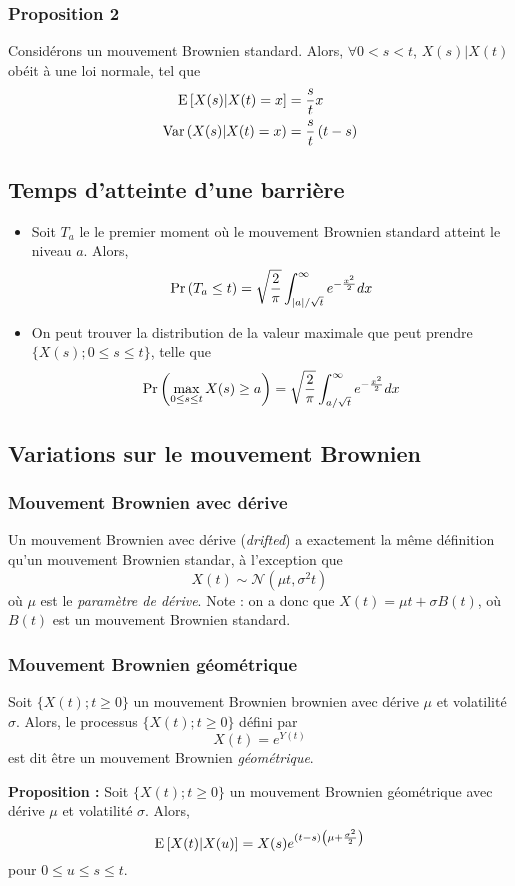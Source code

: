 \documentclass[10pt, french, landscape]{article}
\begin{document}
\begin{multicols*}{3}
\subsubsection*{Proposition 2}
Considérons un mouvement Brownien standard. Alors, $\forall 0 < s < t$, $X(s) | X(t)$ obéit à une loi normale, tel que
\begin{align*}
\mathrm{E} \left[ X(s) | X(t) = x \right]&  = \frac{s}{t} x \\
\mathrm{Var} \left( X(s) |X(t) = x \right) & = \frac{s}{t} \left( t - s \right) \\
\end{align*}

\subsection*{Temps d'atteinte d'une barrière}
\begin{itemize}
\item Soit $T_a$ le le premier moment où le mouvement Brownien standard atteint le niveau $a$. Alors,
\[\Pr \left( T_a \leq t \right) = \sqrt{\frac{2}{\pi}} \int_{|a| / \sqrt{t}}^{\infty} e^{- \frac{x^2}{2}} dx   \]

\item On peut trouver la distribution de la valeur maximale que peut prendre $\{ X(s) ; 0 \leq s \leq t \}$, telle que
\[\Pr \left( \max_{0 \leq s \leq t} X(s) \geq a \right) =  \sqrt{\frac{2}{\pi}} \int_{a / \sqrt{t}}^{\infty} e^{- \frac{x^2}{2}} dx\]
\end{itemize}


\subsection*{Variations sur le mouvement Brownien}
\subsubsection*{Mouvement Brownien avec dérive}
Un mouvement Brownien avec dérive (\emph{drifted}) a exactement la même définition qu'un mouvement Brownien standar, à l'exception que
\[X(t) \sim \mathcal{N} \left(\mu t, \sigma^2 t \right) \]
où $\mu$ est le \emph{paramètre de dérive}. Note : on a donc que $X(t) = \mu t + \sigma B(t)$, où $B(t)$ est un mouvement Brownien standard.

\subsubsection*{Mouvement Brownien géométrique}
\begin{definition}[Définition]
Soit $\{X(t) ; t \geq 0 \}$ un mouvement Brownien brownien avec dérive $\mu$ et volatilité $\sigma$. Alors, le processus $\{X(t) ; t \geq 0 \}$ défini par
\[X(t) = e^{Y(t)}\]
est dit être un mouvement Brownien \emph{géométrique}.
\end{definition}
\textbf{Proposition : } Soit $\{X(t) ; t \geq 0 \}$ un mouvement Brownien géométrique avec dérive $\mu$ et volatilité $\sigma$. Alors,
\[\mathrm{E} \left[ X(t) | X(u) \right] = X(s) e^{(t-s) \left(\mu + \frac{\sigma^2}{2} \right)} \]
pour $ 0 \leq u \leq s \leq t$.


\end{multicols*}
\end{document}
